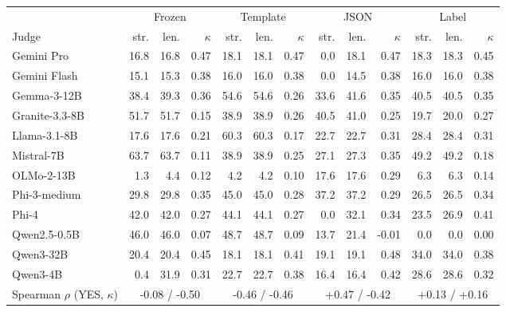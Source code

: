 \begin{tabular}{@{}lrrrrrrrrrrrr@{}}
\toprule
 & \multicolumn{3}{c}{Frozen} & \multicolumn{3}{c}{Template} & \multicolumn{3}{c}{JSON} & \multicolumn{3}{c}{Label} \\
\cmidrule(lr){2-4}\cmidrule(lr){5-7}\cmidrule(lr){8-10}\cmidrule(l){11-13}
Judge & str. & len. & $\kappa$ & str. & len. & $\kappa$ & str. & len. & $\kappa$ & str. & len. & $\kappa$ \\
\midrule
Gemini Pro & 16.8 & 16.8 & 0.47 & 18.1 & 18.1 & 0.47 & 0.0 & 18.1 & 0.47 & 18.3 & 18.3 & 0.45 \\
Gemini Flash & 15.1 & 15.3 & 0.38 & 16.0 & 16.0 & 0.38 & 0.0 & 14.5 & 0.38 & 16.0 & 16.0 & 0.38 \\
Gemma-3-12B & 38.4 & 39.3 & 0.36 & 54.6 & 54.6 & 0.26 & 33.6 & 41.6 & 0.35 & 40.5 & 40.5 & 0.35 \\
Granite-3.3-8B & 51.7 & 51.7 & 0.15 & 38.9 & 38.9 & 0.26 & 40.5 & 41.0 & 0.25 & 19.7 & 20.0 & 0.27 \\
Llama-3.1-8B & 17.6 & 17.6 & 0.21 & 60.3 & 60.3 & 0.17 & 22.7 & 22.7 & 0.31 & 28.4 & 28.4 & 0.31 \\
Mistral-7B & 63.7 & 63.7 & 0.11 & 38.9 & 38.9 & 0.25 & 27.1 & 27.3 & 0.35 & 49.2 & 49.2 & 0.18 \\
OLMo-2-13B & 1.3 & 4.4 & 0.12 & 4.2 & 4.2 & 0.10 & 17.6 & 17.6 & 0.29 & 6.3 & 6.3 & 0.14 \\
Phi-3-medium & 29.8 & 29.8 & 0.35 & 45.0 & 45.0 & 0.28 & 37.2 & 37.2 & 0.29 & 26.5 & 26.5 & 0.34 \\
Phi-4 & 42.0 & 42.0 & 0.27 & 44.1 & 44.1 & 0.27 & 0.0 & 32.1 & 0.34 & 23.5 & 26.9 & 0.41 \\
Qwen2.5-0.5B & 46.0 & 46.0 & 0.07 & 48.7 & 48.7 & 0.09 & 13.7 & 21.4 & -0.01 & 0.0 & 0.0 & 0.00 \\
Qwen3-32B & 20.4 & 20.4 & 0.45 & 18.1 & 18.1 & 0.41 & 19.1 & 19.1 & 0.48 & 34.0 & 34.0 & 0.38 \\
Qwen3-4B & 0.4 & 31.9 & 0.31 & 22.7 & 22.7 & 0.38 & 16.4 & 16.4 & 0.42 & 28.6 & 28.6 & 0.32 \\
\midrule
Spearman $\rho$ (YES, $\kappa$) & \multicolumn{3}{c}{-0.08 / -0.50} & \multicolumn{3}{c}{-0.46 / -0.46} & \multicolumn{3}{c}{+0.47 / -0.42} & \multicolumn{3}{c}{+0.13 / +0.16} \\
\bottomrule
\end{tabular}
